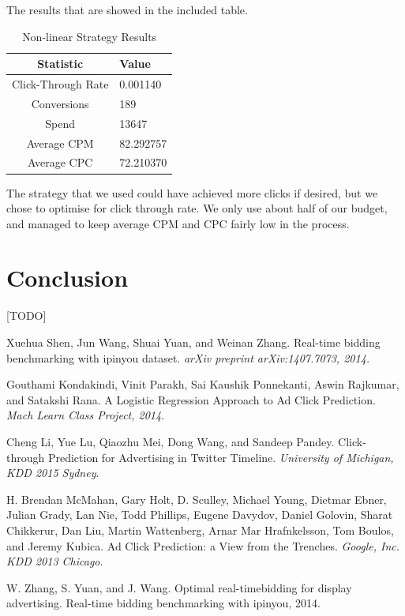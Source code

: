 \documentclass{sig-alternate-05-2015}
\begin{document}
The results that are showed in the included table.
\begin{table}
\centering
\caption{Non-linear Strategy Results}
\begin{tabular}{|c|l|} \hline
\textbf{Statistic}&\textbf{Value}\\ \hline
Click-Through Rate&0.001140\\ \hline
Conversions&189\\ \hline
Spend&13647\\ \hline
Average CPM&82.292757\\ \hline
Average CPC&72.210370\\
\hline\end{tabular}
\end{table}
The strategy that we used could have achieved more clicks if desired, but we chose to optimise for click through rate. We only
use about half of our budget, and managed to keep average CPM and CPC fairly low in the process.

\section{Conclusion}

[TODO]

\begin{thebibliography}{4}
Xuehua Shen, Jun Wang, Shuai Yuan, and Weinan Zhang.
Real-time bidding benchmarking with ipinyou
dataset.
\textit{arXiv preprint arXiv:1407.7073, 2014.}

Gouthami Kondakindi, Vinit Parakh, Sai Kaushik Ponnekanti, Aswin Rajkumar, and Satakshi Rana.
A Logistic Regression Approach to Ad Click
Prediction.
\textit{Mach Learn Class Project, 2014}.

Cheng Li, Yue Lu, Qiaozhu Mei, Dong Wang, and Sandeep Pandey.
Click-through Prediction for Advertising in Twitter Timeline.
\textit{University of Michigan, KDD 2015 Sydney}.

H. Brendan McMahan, Gary Holt, D. Sculley, Michael Young, Dietmar Ebner, Julian Grady, Lan Nie, Todd Phillips, Eugene Davydov, Daniel Golovin, Sharat Chikkerur, Dan Liu, Martin Wattenberg, Arnar Mar Hrafnkelsson, Tom Boulos, and Jeremy Kubica.
Ad Click Prediction: a View from the Trenches.
\textit{Google, Inc. KDD 2013 Chicago}.

W. Zhang, S. Yuan, and J. Wang.
Optimal real-timebidding for display advertising.
Real-time bidding benchmarking with ipinyou, 2014.

\end{thebibliography}
\end{document}
